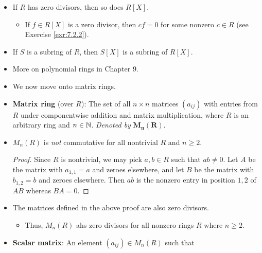 \documentclass[../notes.tex]{subfiles}
\begin{document}
\begin{itemize}
\begin{proposition}
\begin{enumerate}
\begin{proof}
                Therefore, $p(x),q(x)\in R$ and hence are units of $R$, as desired.
            \end{proof}
            \item $R[X]$ is an integral domain.
            \begin{proof}
                We have already established that the commutativity and identity of $R[X]$ follow from $R$. As to no zero divisors, this constraint follows from part (1).
            \end{proof}
        \end{enumerate}
    \end{proposition}
    \item If $R$ has zero divisors, then so does $R[X]$.
    \begin{itemize}
        \item If $f\in R[X]$ is a zero divisor, then $cf=0$ for some nonzero $c\in R$ (see Exercise \ref{exr:7.2.2}).
    \end{itemize}
    \item If $S$ is a subring of $R$, then $S[X]$ is a subring of $R[X]$.
    \item More on polynomial rings in Chapter 9.
    \item {}We now move onto matrix rings.
    \item \textbf{Matrix ring} (over $R$): The set of all $n\times n$ matrices $(a_{ij})$ with entries from $R$ under componentwise addition and matrix multiplication, where $R$ is an arbitrary ring and $n\in\mathbb{N}$. \emph{Denoted by} $\bm{M_n(R)}$.
    \item $M_n(R)$ is \emph{not} commutative for all nontrivial $R$ and $n\geq 2$.
    \begin{proof}
        Since $R$ is nontrivial, we may pick $a,b\in R$ such that $ab\neq 0$. Let $A$ be the matrix with $a_{1,1}=a$ and zeroes elsewhere, and let $B$ be the matrix with $b_{1,2}=b$ and zeroes elsewhere. Then $ab$ is the nonzero entry in position $1,2$ of $AB$ whereas $BA=0$.
    \end{proof}
    \item The matrices defined in the above proof are also zero divisors.
    \begin{itemize}
        \item Thus, $M_n(R)$ ahs zero divisors for all nonzero rings $R$ where $n\geq 2$.
    \end{itemize}
    \item \textbf{Scalar matrix}: An element $(a_{ij})\in M_n(R)$ such that

\end{itemize}
\end{document}
